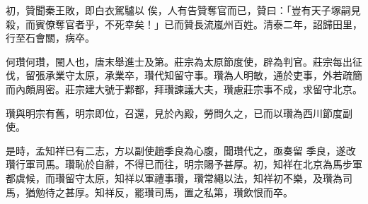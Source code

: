 \begin{pinyinscope}
 初，贊聞秦王敗，即白衣駕驢以
 俟，人有告贊奪官而已，贊曰：「豈有天子塚嗣見殺，而賓僚奪官者乎，不死幸矣！」已而贊長流嵐州百姓。清泰二年，詔歸田里，行至石會關，病卒。



 何瓚何瓚，閩人也，唐末舉進士及第。莊宗為太原節度使，辟為判官。莊宗每出征伐，留張承業守太原，承業卒，瓚代知留守事。瓚為人明敏，通於吏事，外若疏簡而內頗周密。莊宗建大號于鄴都，拜瓚諫議大夫，瓚慮莊宗事不成，求留守北京。



 瓚與明宗有舊，明宗即位，召還，見於內殿，勞問久之，已而以瓚為西川節度副使。



 是時，孟知祥已有二志，方以副使趙季良為心腹，聞瓚代之，亟奏留
 季良，遂改瓚行軍司馬。瓚恥於自辭，不得已而往，明宗賜予甚厚。初，知祥在北京為馬步軍都虞候，而瓚留守太原，知祥以軍禮事瓚，瓚常繩以法，知祥初不樂，及瓚為司馬，猶勉待之甚厚。知祥反，罷瓚司馬，置之私第，瓚飲恨而卒。



\end{pinyinscope}